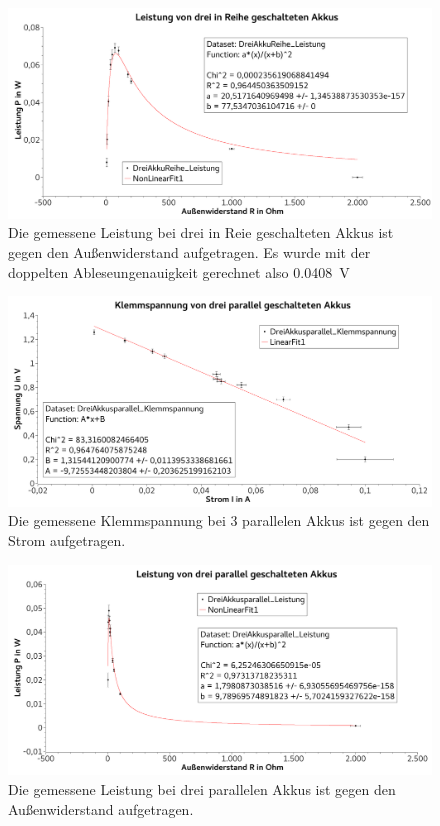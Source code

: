 \documentclass[
	a4paper,
	12pt,
	pagesize,
	ngerman
]{scrartcl}
\begin{document}
	\begin{figure}[tb]
		\includegraphics[width=1\textwidth]{Leistung3Reihe}
		\centering
		\caption{Die gemessene Leistung bei drei in Reie geschalteten Akkus ist gegen den Außenwiderstand aufgetragen. Es wurde mit der doppelten Ableseungenauigkeit gerechnet also \SI{0,0408}{V}}
		\label{Leistung3Reihe}
		\centering
	\end{figure}
	
	\begin{figure}[tb]
		\includegraphics[width=1\textwidth]{Spannung3Parallel}
		\centering
		\caption{Die gemessene Klemmspannung bei 3 parallelen Akkus ist gegen den Strom aufgetragen.}
		\label{Spannung3Parallel}
		\centering
	\end{figure}

	\begin{figure}[tb]
		\includegraphics[width=1\textwidth]{Leistung3Parallel}
		\centering
		\caption{Die gemessene Leistung bei drei parallelen Akkus ist gegen den Außenwiderstand aufgetragen.}
		\label{Leistung3Parallel}
		\centering
	\end{figure}
\end{document}
